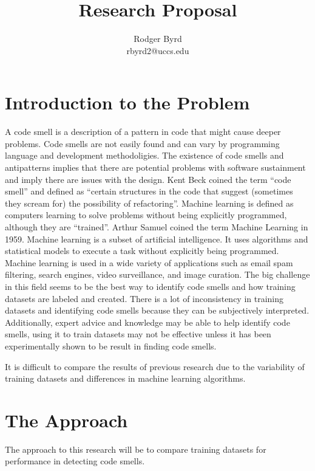 \documentclass[conference]{IEEEtran}
\begin{document}

\title{Research Proposal}
\author{Rodger Byrd\\rbyrd2@uccs.edu}
\maketitle



\section{Introduction to the Problem}
A code smell is a description of a pattern in code that might cause deeper problems. 
Code smells are not easily found and can vary by programming language and development methodoligies.
The existence of code smells and antipatterns implies that there are potential problems with software sustainment and imply there are issues with the design.
Kent Beck coined the term ``code smell'' \cite{fowler_refactoring:_2018} and defined as ``certain structures in the code that suggest (sometimes they scream for) the possibility of refactoring''.
Machine learning is defined as computers learning to solve problems without being explicitly programmed, although they are ``trained''\cite{bishop_pattern_2006}. 
Arthur Samuel coined the term Machine Learning in 1959\cite{samuel_studies_1988}.
Machine learning is a subset of artificial intelligence. 
It uses algorithms and statistical models to execute a task without explicitly being programmed.
Machine learning is used in a wide variety of applications such as email spam filtering, search engines, video surveillance, and image curation.
The big challenge in this field seems to be the best way to identify code smells and how training datasets are labeled and created.
There is a lot of inconsistency in training datasets and identifying code smells because they can be subjectively interpreted.
Additionally, expert advice and knowledge may be able to help identify code smells, using it to train datasets may not be effective unless it has been experimentally shown to be result in finding code smells. 

It is difficult to compare the results of previous research due to the variability of training datasets and differences in machine learning algorithms.

\section{The Approach}
The approach to this research will be to compare training datasets for performance in detecting code smells.
\end{document}
